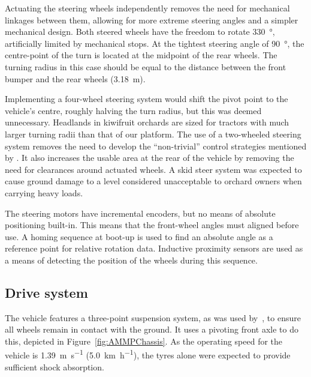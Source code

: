 \documentclass[preprint,authoryear,12pt]{elsarticle}
\begin{document}
        Actuating the steering wheels independently removes the need for mechanical linkages between them, allowing for more extreme steering angles and a simpler mechanical design.
        Both steered wheels have the freedom to rotate \SI{330}{\degree}, artificially limited by mechanical stops.
        At the tightest steering angle of \SI{90}{\degree}, the centre-point of the turn is located at the midpoint of the rear wheels.
        The turning radius in this case should be equal to the distance between the front bumper and the rear wheels (\SI{3.18}{\meter}).

        Implementing a four-wheel steering system would shift the pivot point to the vehicle's centre, roughly halving the turn radius, but this was deemed unnecessary.
        Headlands in kiwifruit orchards are sized for tractors with much larger turning radii than that of our platform.
        The use of a two-wheeled steering system removes the need to develop the ``non-trivial'' control strategies mentioned by \cite{Bak2004}.
        It also increases the usable area at the rear of the vehicle by removing the need for clearances around actuated wheels.
        A skid steer system was expected to cause ground damage to a level considered unacceptable to orchard owners when carrying heavy loads.

        The steering motors have incremental encoders, but no means of absolute positioning built-in.
        This means that the front-wheel angles must aligned before use.
        A homing sequence at boot-up is used to find an absolute angle as a reference point for relative rotation data.
        Inductive proximity sensors are used as a means of detecting the position of the wheels during this sequence.

    \subsection{Drive system}
    \label{sub:drive}
        The vehicle features a three-point suspension system, as was used by~\cite{Bak2004}, to ensure all wheels remain in contact with the ground.
        It uses a pivoting front axle to do this, depicted in Figure~\ref{fig:AMMPChassis}.
        As the operating speed for the vehicle is \SI{1.39}{\meter\per\second} (\SI{5.0}{\kilo\meter\per\hour}), the tyres alone were expected to provide sufficient shock absorption.

\end{document}
